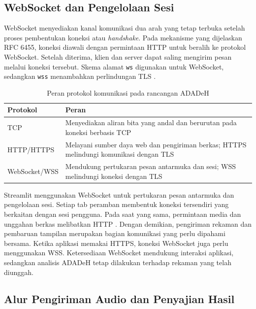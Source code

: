 \subsection{WebSocket dan Pengelolaan Sesi}
\label{websocket}

WebSocket menyediakan kanal komunikasi dua arah yang tetap terbuka setelah proses pembentukan koneksi atau \textit{handshake}. Pada mekanisme yang dijelaskan RFC 6455, koneksi diawali dengan permintaan HTTP untuk beralih ke protokol WebSocket. Setelah diterima, klien dan server dapat saling mengirim pesan melalui koneksi tersebut. Skema alamat \texttt{ws} digunakan untuk WebSocket, sedangkan \texttt{wss} menambahkan perlindungan TLS \autocite{fette2011websocket}.

\begin{table}[t]
  \centering
  \caption{Peran protokol komunikasi pada rancangan ADADeH}
  \label{tab:protokol}
  \begin{tabularx}{\textwidth}{| l | X |}
    \hline
    \textbf{Protokol} & \textbf{Peran} \\
    \hline
    TCP           & Menyediakan aliran bita yang andal dan berurutan pada koneksi berbasis TCP \\
    HTTP/HTTPS    & Melayani sumber daya web dan pengiriman berkas; HTTPS melindungi komunikasi dengan TLS \\
    WebSocket/WSS & Mendukung pertukaran pesan antarmuka dan sesi; WSS melindungi koneksi dengan TLS \\
    \hline
  \end{tabularx}
\end{table}

Streamlit menggunakan WebSocket untuk pertukaran pesan antarmuka dan pengelolaan sesi. Setiap tab peramban membentuk koneksi tersendiri yang berkaitan dengan sesi pengguna. Pada saat yang sama, permintaan media dan unggahan berkas melibatkan HTTP \autocite{streamlit2026docs}. Dengan demikian, pengiriman rekaman dan pembaruan tampilan merupakan bagian komunikasi yang perlu dipahami bersama. Ketika aplikasi memakai HTTPS, koneksi WebSocket juga perlu menggunakan WSS. Ketersediaan WebSocket mendukung interaksi aplikasi, sedangkan analisis ADADeH tetap dilakukan terhadap rekaman yang telah diunggah.

\subsection{Alur Pengiriman Audio dan Penyajian Hasil}
\label{alur_kirim}

